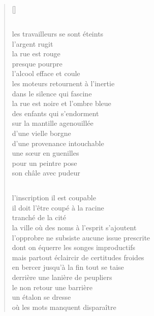 \documentclass[a4paper, titlepage, twoside, 12pt]{book}
\begin{document}
\begin{verse}[\versewidth]
\subsection*{}
les travailleurs se sont éteints\\
l'argent rugit\\
la rue est rouge\\
presque pourpre\\
l'alcool efface et coule\\
les moteurs retournent à l'inertie\\
dans le silence qui fascine\\
la rue est noire et l'ombre bleue\\
des enfants qui s'endorment\\
sur la mantille agenouillée\\
d'une vielle borgne\\
d'une provenance intouchable\\
une s\oe ur en guenilles\\
pour un peintre pose\\
son châle avec pudeur

\subsection*{}
l'inscription il est coupable\\
il doit l'être coupé à la racine\\
tranché de la cité\\
la ville où des noms à l'esprit s'ajoutent\\
l'opprobre ne subsiste aucune issue prescrite\\
dont on équerre les songes improductifs\\
mais partout éclaircir de certitudes froides\\
en bercer jusqu'à la fin tout se taise\\
derrière une lanière de peupliers\\
le non retour une barrière\\
un étalon se dresse\\
où les mots manquent disparaître


\end{verse}
\end{document}
